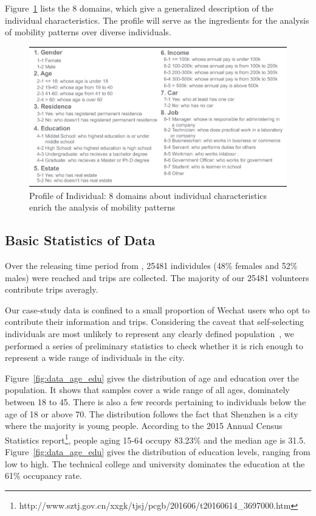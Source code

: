 Figure~\ref{fig:data_over} lists the 8 domains, which give a generalized description of the individual characteristics. The profile will serve as the ingredients for the analysis of mobility patterns over diverse individuals. 

\begin{figure}[htb!]
 \centering %
 \includegraphics[width=\columnwidth]{pictures/data_over}
 \caption{Profile of Individual: 8 domains about individual characteristics enrich the analysis of mobility patterns}
 \label{fig:data_over}
\end{figure}

\subsection{Basic Statistics of Data}

Over the releasing time period from , 25481 individules (48\% females and 52\% males) were reached and  trips are collected. The majority of our 25481 volunteers contribute  trips averagly. 

Our case-study data is confined to a small proportion of Wechat users who opt to contribute their information and trips.
Considering the caveat that self-selecting individuals are most unlikely to represent any clearly defined population~\cite{Longley2015}, we performed a series of preliminary statistics to check whether it is rich enough to represent a wide range of individuals in the city. 

Figure~\ref{fig:data_age_edu} gives the distribution of age and education over the population. It shows that samples cover a wide range of all ages, dominately between 18 to 45. There is also a few records pertaining to individuals below the age of 18 or above 70. The distribution follows the fact that Shenzhen is a city where the majority is young people. According to the 2015 Annual Census Statistics report\footnote{http://www.sztj.gov.cn/xxgk/tjsj/pcgb/201606/t20160614\_3697000.htm}, people aging 15-64 occupy 83.23\% and the median age is 31.5. Figure~\ref{fig:data_age_edu} gives the distribution of education levels, ranging from low to high. The technical college and university dominates the education at the 61\% occupancy rate. 

